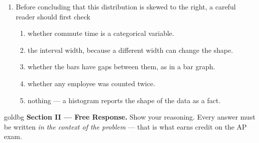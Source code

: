 \documentclass[12pt]{article}
\begin{document}
\begin{enumerate}[leftmargin=1.9em, itemsep=0.11in]
  \item Before concluding that this distribution is skewed to the right, a careful reader should
        first check
        \begin{enumerate}[label=\textbf{(\Alph*)}, leftmargin=2.2em, itemsep=2pt]
          \item whether commute time is a categorical variable.
          \item the interval width, because a different width can change the shape.
          \item whether the bars have gaps between them, as in a bar graph.
          \item whether any employee was counted twice.
          \item nothing --- a histogram reports the shape of the data as a fact.
                \hfill{}
        \end{enumerate}

\end{enumerate}

\vspace{0.10in}

\boxguard[16]
\begin{headlinebox}{goldbg}
\small
\textbf{Section II --- Free Response.} Show your reasoning. Every answer must be written
\emph{in the context of the problem} --- that is what earns credit on the AP exam.
\end{headlinebox}

\vspace{0.10in}
\end{document}
